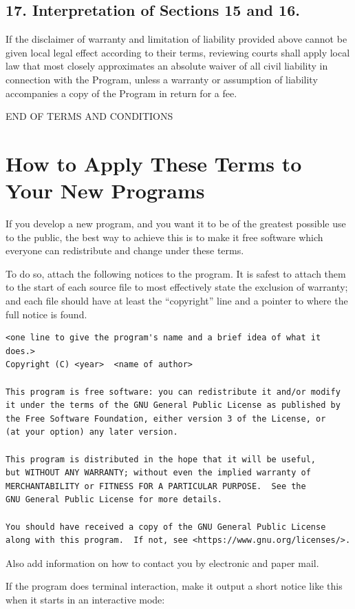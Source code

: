 \subsection{17. Interpretation of Sections 15 and 16.}
If the disclaimer of warranty and limitation of liability provided above cannot be given local legal effect according to their terms, reviewing courts shall apply local law that most closely approximates an absolute waiver of all civil liability in connection with the Program, unless a warranty or assumption of liability accompanies a copy of the Program in return for a fee.
\begin{center}END OF TERMS AND CONDITIONS\end{center}
\section{How to Apply These Terms to Your New Programs}
If you develop a new program, and you want it to be of the greatest possible use to the public, the best way to achieve this is to make it free software which everyone can redistribute and change under these terms.\par
To do so, attach the following notices to the program. It is safest to attach them to the start of each source file to most effectively state the exclusion of warranty; and each file should have at least the “copyright” line and a pointer to where the full notice is found.
\begin{verbatim}
<one line to give the program's name and a brief idea of what it does.>
Copyright (C) <year>  <name of author>

This program is free software: you can redistribute it and/or modify
it under the terms of the GNU General Public License as published by
the Free Software Foundation, either version 3 of the License, or
(at your option) any later version.

This program is distributed in the hope that it will be useful,
but WITHOUT ANY WARRANTY; without even the implied warranty of
MERCHANTABILITY or FITNESS FOR A PARTICULAR PURPOSE.  See the
GNU General Public License for more details.

You should have received a copy of the GNU General Public License
along with this program.  If not, see <https://www.gnu.org/licenses/>.
\end{verbatim}\par
Also add information on how to contact you by electronic and paper mail.\par
If the program does terminal interaction, make it output a short notice like this when it starts in an interactive mode:
